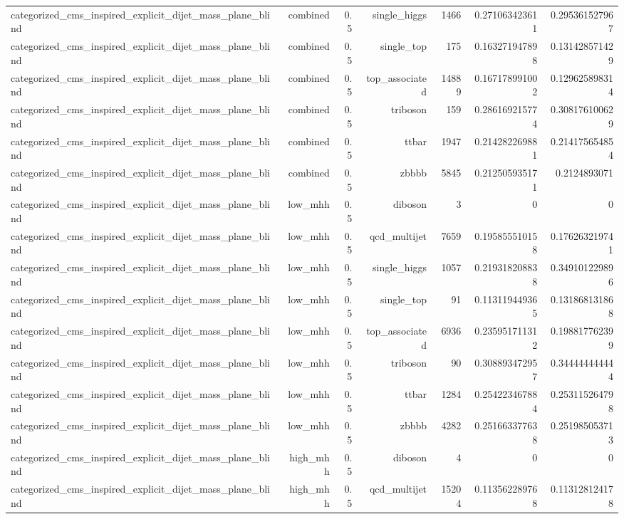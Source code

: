 \begin{table}[htbp]
{\begin{tabular}{lrrrrrr}
categorized\_cms\_inspired\_explicit\_dijet\_mass\_plane\_blind & combined & 0.5 & single\_higgs & 1466 & 0.271063423611 & 0.295361527967 \\
categorized\_cms\_inspired\_explicit\_dijet\_mass\_plane\_blind & combined & 0.5 & single\_top & 175 & 0.163271947898 & 0.131428571429 \\
categorized\_cms\_inspired\_explicit\_dijet\_mass\_plane\_blind & combined & 0.5 & top\_associated & 14889 & 0.167178991002 & 0.129625898314 \\
categorized\_cms\_inspired\_explicit\_dijet\_mass\_plane\_blind & combined & 0.5 & triboson & 159 & 0.286169215774 & 0.308176100629 \\
categorized\_cms\_inspired\_explicit\_dijet\_mass\_plane\_blind & combined & 0.5 & ttbar & 1947 & 0.214282269881 & 0.214175654854 \\
categorized\_cms\_inspired\_explicit\_dijet\_mass\_plane\_blind & combined & 0.5 & zbbbb & 5845 & 0.212505935171 & 0.2124893071 \\
categorized\_cms\_inspired\_explicit\_dijet\_mass\_plane\_blind & low\_mhh & 0.5 & diboson & 3 & 0 & 0 \\
categorized\_cms\_inspired\_explicit\_dijet\_mass\_plane\_blind & low\_mhh & 0.5 & qcd\_multijet & 7659 & 0.195855510158 & 0.176263219741 \\
categorized\_cms\_inspired\_explicit\_dijet\_mass\_plane\_blind & low\_mhh & 0.5 & single\_higgs & 1057 & 0.219318208838 & 0.349101229896 \\
categorized\_cms\_inspired\_explicit\_dijet\_mass\_plane\_blind & low\_mhh & 0.5 & single\_top & 91 & 0.113119449365 & 0.131868131868 \\
categorized\_cms\_inspired\_explicit\_dijet\_mass\_plane\_blind & low\_mhh & 0.5 & top\_associated & 6936 & 0.235951711312 & 0.198817762399 \\
categorized\_cms\_inspired\_explicit\_dijet\_mass\_plane\_blind & low\_mhh & 0.5 & triboson & 90 & 0.308893472957 & 0.344444444444 \\
categorized\_cms\_inspired\_explicit\_dijet\_mass\_plane\_blind & low\_mhh & 0.5 & ttbar & 1284 & 0.254223467884 & 0.253115264798 \\
categorized\_cms\_inspired\_explicit\_dijet\_mass\_plane\_blind & low\_mhh & 0.5 & zbbbb & 4282 & 0.251663377638 & 0.251985053713 \\
categorized\_cms\_inspired\_explicit\_dijet\_mass\_plane\_blind & high\_mhh & 0.5 & diboson & 4 & 0 & 0 \\
categorized\_cms\_inspired\_explicit\_dijet\_mass\_plane\_blind & high\_mhh & 0.5 & qcd\_multijet & 15204 & 0.113562289768 & 0.113128124178 \\

\end{tabular}}
\end{table}
